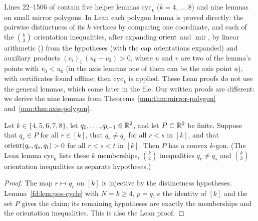 Lines 22--1506 of  contain five helper lemmas $\mathrm{cyc}_k$
($k=4,\dots,8$) and nine lemmas on small mirror polygons. In Lean each polygon lemma is proved directly:
the pairwise distinctness of its $k$ vertices by comparing one coordinate, and each of the $\binom k3$
orientation inequalities, after expanding $\operatorname{orient}$ and $\operatorname{mir}$, by linear arithmetic
() from the hypotheses (with the cap orientations expanded) and auxiliary products
$(c_i)_1\,(u_0-v_0)>0$, where $u$ and $v$ are two of the lemma's points with $v_0<u_0$ (in the axis
lemmas one of them can be the axis point $a$), with certificates found offline; then $\mathrm{cyc}_k$ is
applied. These Lean proofs do not use the
general lemmas, which come later in the file. Our written proofs are different: we derive the nine lemmas
from Theorems~\ref{mm:thm:mirror-polygon} and~\ref{mm:thm:axis-polygon}.

\begin{lemma}\label{mm:lem:cyc}
Let $k\in\{4,5,6,7,8\}$, let $q_0,\dots,q_{k-1}\in\mathbb R^2$, and let $P\subset\mathbb R^2$ be finite. Suppose that
$q_r\in P$ for all $r\in[k]$, that $q_r\ne q_s$ for all $r<s$ in $[k]$, and that
$\operatorname{orient}(q_r,q_s,q_t)>0$ for all $r<s<t$ in $[k]$. Then $P$ has a convex $k$-gon. (The Lean lemma
$\mathrm{cyc}_k$ lists these $k$ memberships, $\binom k2$ inequalities $q_r\ne q_s$ and $\binom k3$
orientation inequalities as separate hypotheses.)
\end{lemma}

\begin{proof}
The map $r\mapsto q_r$ on $[k]$ is injective by the distinctness hypotheses. Lemma~\ref{fd:lem:pos-cycle}
with $N=k\ge4$, $p=q$, $e$ the identity of $[k]$ and the set $P$ gives the claim; its remaining hypotheses
are exactly the memberships and the orientation inequalities. This is also the Lean proof.
\end{proof}

